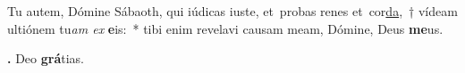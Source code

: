 
Tu autem, Dómine Sábaoth, qui iúdicas iuste, et~probas renes et~cor\underline{da},~† vídeam ultiónem tu\textit{am ex} \textbf{e}is:~* tibi enim revelavi causam meam, Dómine, Deus \textbf{me}us.

\textbf{\Rbar.} Deo \textbf{grá}tias.


